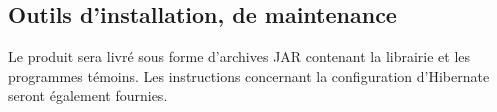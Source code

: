 \subsection{Outils d’installation, de maintenance}

Le produit sera livré sous forme d'archives JAR contenant la librairie et les programmes témoins.
Les instructions concernant la configuration d'Hibernate seront également fournies.


